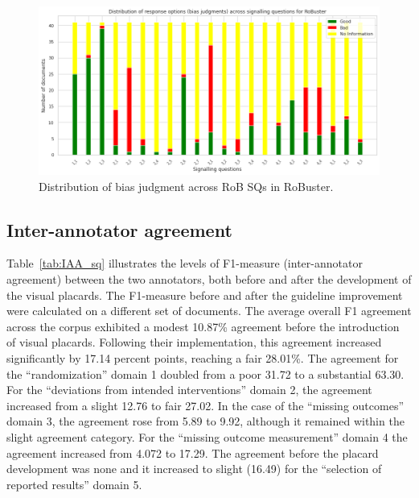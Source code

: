 \documentclass[sn-mathphys,Numbered]{sn-jnl}%
\theoremstyle{thmstyleone}%
\theoremstyle{thmstyletwo}%
\theoremstyle{thmstylethree}%
\begin{document}
%
%
%
\begin{figure}[htb]
    \centering
    \includegraphics[width=0.90\columnwidth]{figures/bias_chart.png}
    \caption{Distribution of bias judgment across RoB SQs in RoBuster.}
    \label{fig:rob_information}
\end{figure}
%
%
%

%
%
%
\subsection{Inter-annotator agreement}
\label{result:iaa}
%
Table~\ref{tab:IAA_sq} illustrates the levels of F1-measure (inter-annotator agreement) between the two annotators, both before and after the development of the visual placards.
The F1-measure before and after the guideline improvement were calculated on a different set of documents.
The average overall F1 agreement across the corpus exhibited a modest 10.87\% agreement before the introduction of visual placards.
Following their implementation, this agreement increased significantly by 17.14 percent points, reaching a fair 28.01\%.
The agreement for the ``randomization'' domain 1 doubled from a poor 31.72 to a substantial 63.30.
For the ``deviations from intended interventions'' domain 2, the agreement increased from a slight 12.76 to fair 27.02.
In the case of the ``missing outcomes'' domain 3, the agreement rose from 5.89 to 9.92, although it remained within the slight agreement category. 
For the ``missing outcome measurement'' domain 4 the agreement increased from 4.072 to 17.29.
The agreement before the placard development was none and it increased to slight (16.49) for the ``selection of reported results'' domain 5.
\end{document}
